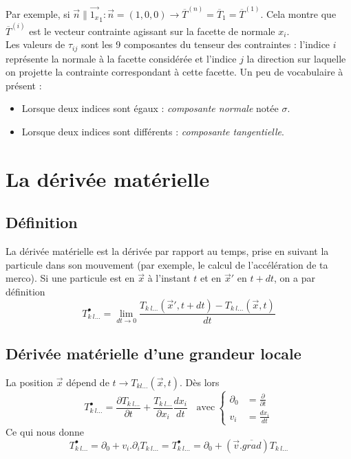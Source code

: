     \newpage
    Par exemple, si $\vec{n} \parallel \vec{1_x}_{1} : \vec{n} = (1,0,0) \rightarrow  \overline{T}^{(n)} =
     \overline{T}_1 =  \overline{T}^{(1)}$. Cela montre que $ \overline{T}^{(i)}$ est le vecteur contrainte
     agissant sur la facette de normale $x_i$.\\
     
     Les valeurs de $\tau_{ij}$ sont les 9 composantes du tenseur des contraintes : l'indice $i$ représente
     la normale à la facette considérée et l'indice $j$ la direction sur laquelle on projette la contrainte
     correspondant à cette facette. Un peu de vocabulaire à présent :
     \begin{itemize}
     \item Lorsque deux indices sont égaux : \textit{composante normale} notée $\sigma$.
     \item Lorsque deux indices sont différents : \textit{composante tangentielle}.
     \end{itemize}
    
    
    
    
\section{La dérivée matérielle}
    \subsection{Définition}
    La dérivée matérielle est la dérivée par rapport au temps, prise en suivant la particule dans son 
    mouvement (par exemple, le calcul de l'accélération de ta merco). Si une particule est en $\vec{x}$
    à l'instant $t$ et en $\vec{x}'$ en $t+dt$, on a par définition
    \begin{equation}
    T_{k\ l\dots}^\bullet = \lim\limits_{dt \rightarrow 0} \dfrac{T_{k\ l\dots}(\vec{x}',t+dt) - T_{k\ l\dots}
    (\vec x,t)}{dt}
    \end{equation}
    
    \subsection{Dérivée matérielle d'une grandeur locale}
    La position $\vec{x}$ dépend de $t \rightarrow T_{kl\dots} (\vec{x},t)$. Dès lors
    \begin{equation}
    T_{k\ l\dots}^\bullet = \frac{\partial T_{k\ l\dots}}{\partial t} + \frac{T_{k\ l\dots}}{\partial x_i}
    \frac{dx_i}{dt}\ \ \ \ \text{avec}\ \left\{\begin{array}{ll}
    \partial_0 &= \frac{\partial}{\partial t}  \\
    v_i &= \frac{dx_i}{dt} 
    \end{array}\right.
    \end{equation}
    Ce qui nous donne 
    \begin{equation}
    T_{k\ l\dots}^\bullet = \partial_0 + v_i.\partial_iT_{k\ l\dots} = T_{k\ l\dots}^\bullet = \partial_0 +
    (\vec v.\overline{grad})T_{k\ l\dots}
    \end{equation}
    
